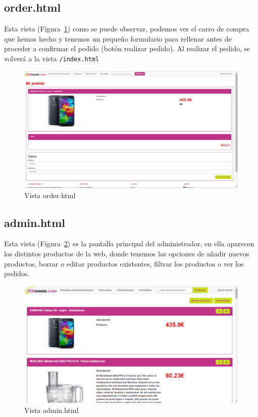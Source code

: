 \documentclass[12pt,a4paper,svgnames]{article}
\begin{document}
\subsection{order.html}
Esta vista (Figura~\ref{fig:order}) como se puede observar, podemos ver el carro de compra que hemos hecho y tenemos un pequeño formulario para rellenar antes de proceder a confirmar el pedido (botón realizar pedido). Al realizar el pedido, se volverá a la vista \texttt{/index.html}

\begin{figure}[htbp]
	\centering
	\includegraphics[width=1\linewidth]{imagenes/order}
	\caption{Vista order.html}
	\label{fig:order}
\end{figure}

\clearpage

\subsection{admin.html}
Esta vista (Figura~\ref{fig:admin}) es la pantalla principal del administrador, en ella aparecen los distintos productos de la web, donde tenemos las opciones de añadir nuevos productos, borrar o editar productos existentes, filtrar los productos o ver los pedidos.

\begin{figure}[htbp]
	\centering
	\includegraphics[width=1\linewidth]{imagenes/admin}
	\caption{Vista admin.html}
	\label{fig:admin}
\end{figure}
\end{document}
